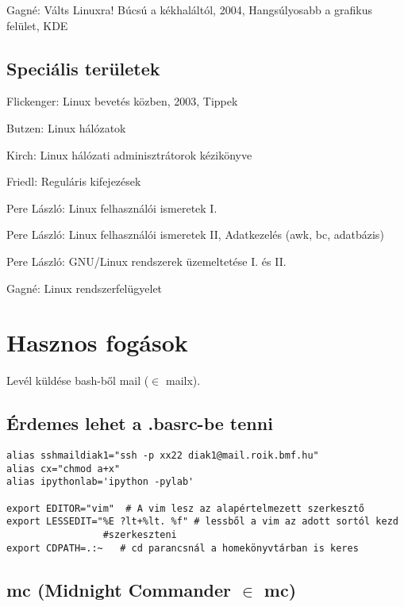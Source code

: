 \documentclass[a4paper]{article}
\newcommand{\code}{\texttt}
\begin{document}
Gagné: Válts Linuxra! Búcsú a kékhaláltól, 2004, Hangsúlyosabb a grafikus felület, KDE

\subsection{Speciális területek}

Flickenger: Linux bevetés közben, 2003, Tippek

Butzen: Linux hálózatok

Kirch: Linux hálózati adminisztrátorok kézikönyve

Friedl: Reguláris kifejezések

Pere László: Linux felhasználói ismeretek I.

Pere László: Linux felhasználói ismeretek II, Adatkezelés (awk, bc, adatbázis)

Pere László: GNU/Linux rendszerek üzemeltetése I. és II.

Gagné: Linux rendszerfelügyelet

\section{Hasznos fogások}

Levél küldése bash-ből mail ($\in$ mailx).


\subsection{Érdemes lehet a .basrc-be tenni}

\hspace{1 ex}
\begin{Verbatim}[label=\fbox{~/.bashrc}, frame=single]
alias sshmaildiak1="ssh -p xx22 diak1@mail.roik.bmf.hu"
alias cx="chmod a+x"
alias ipythonlab='ipython -pylab'

export EDITOR="vim"  # A vim lesz az alapértelmezett szerkesztő
export LESSEDIT="%E ?lt+%lt. %f" # lessből a vim az adott sortól kezd
				 #szerkeszteni
export CDPATH=.:~   # cd parancsnál a homekönyvtárban is keres
\end{Verbatim}

\subsection{mc (Midnight Commander $\in$ mc)}
\end{document}
